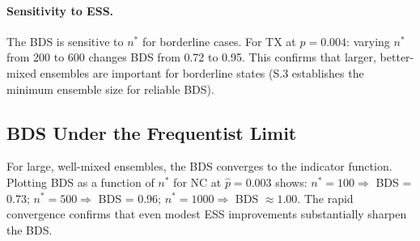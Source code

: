 \paragraph{Sensitivity to ESS.}
The BDS is sensitive to $n^*$ for borderline cases. For TX at $\hat{p} = 0.004$:
varying $n^*$ from 200 to 600 changes BDS from 0.72 to 0.95. This confirms that
larger, better-mixed ensembles are important for borderline states (S.3 establishes
the minimum ensemble size for reliable BDS).

\subsection{BDS Under the Frequentist Limit}

For large, well-mixed ensembles, the BDS converges to the indicator function.
Plotting BDS as a function of $n^*$ for NC at $\hat{p} = 0.003$ shows:
$n^* = 100 \Rightarrow$ BDS = 0.73; $n^* = 500 \Rightarrow$ BDS = 0.96;
$n^* = 1000 \Rightarrow$ BDS $\approx 1.00$.
The rapid convergence confirms that even modest ESS improvements substantially
sharpen the BDS.
